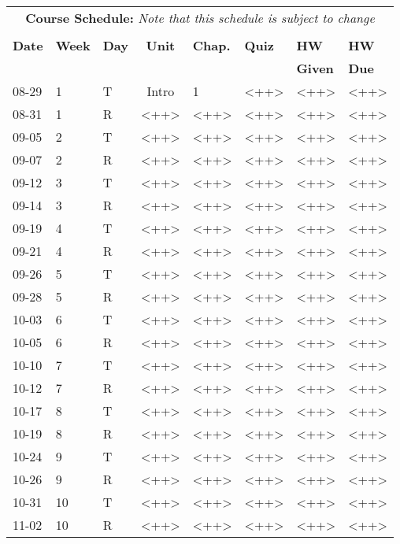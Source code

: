 \documentclass[11pt, a4paper]{article}
\begin{document}
\pagebreak
\FloatBarrier
\renewcommand{\arraystretch}{1}
\begin{table}[h]
\begin{center}
\begin{tabular}{lllcllll}
\multicolumn{8}{c}{\textbf{Course Schedule:}\textit{ Note that this schedule is subject to change}}\\
&&&&&&&\\
\textbf{Date} & \textbf{Week} & \textbf{Day} & \textbf{Unit} & \textbf{Chap.} & \textbf{Quiz} & \textbf{HW} & \textbf{HW}\\
 &  &  &  &  &                                                                                          & \textbf{Given} & \textbf{Due}\\
\hline
\hline
08-29 & 1 & T & Intro & 1 & <++> & <++> & <++> \\
08-31 & 1 & R & <++> & <++> & <++> & <++> & <++>\\
09-05 & 2 & T & <++> & <++> & <++> & <++> & <++>\\
09-07 & 2 & R & <++> & <++> & <++> & <++> & <++>\\
09-12 & 3 & T & <++> & <++> & <++> & <++> & <++>\\
09-14 & 3 & R & <++> & <++> & <++> & <++> & <++>\\
09-19 & 4 & T & <++> & <++> & <++> & <++> & <++>\\
09-21 & 4 & R & <++> & <++> & <++> & <++> & <++>\\
09-26 & 5 & T & <++> & <++> & <++> & <++> & <++>\\
09-28 & 5 & R & <++> & <++> & <++> & <++> & <++>\\
10-03 & 6 & T & <++> & <++> & <++> & <++> & <++>\\
10-05 & 6 & R & <++> & <++> & <++> & <++> & <++>\\
10-10 & 7 & T & <++> & <++> & <++> & <++> & <++>\\
10-12 & 7 & R & <++> & <++> & <++> & <++> & <++>\\
10-17 & 8 & T & <++> & <++> & <++> & <++> & <++>\\
10-19 & 8 & R & <++> & <++> & <++> & <++> & <++>\\
10-24 & 9 & T & <++> & <++> & <++> & <++> & <++>\\
10-26 & 9 & R & <++> & <++> & <++> & <++> & <++>\\
10-31 & 10 & T & <++> & <++> & <++> & <++> & <++>\\
11-02 & 10 & R & <++> & <++> & <++> & <++> & <++>\\

\end{tabular}
\end{center}
\end{table}
\end{document}
